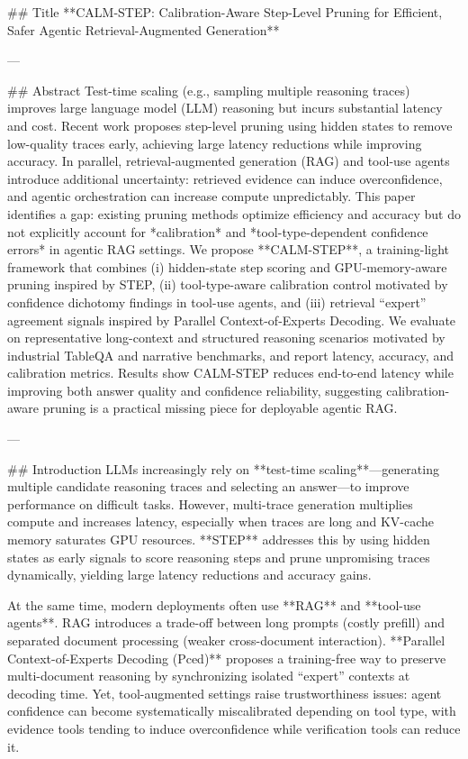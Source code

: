 ## Title  
**CALM-STEP: Calibration-Aware Step-Level Pruning for Efficient, Safer Agentic Retrieval-Augmented Generation**

---

## Abstract  
Test-time scaling (e.g., sampling multiple reasoning traces) improves large language model (LLM) reasoning but incurs substantial latency and cost. Recent work proposes step-level pruning using hidden states to remove low-quality traces early, achieving large latency reductions while improving accuracy. In parallel, retrieval-augmented generation (RAG) and tool-use agents introduce additional uncertainty: retrieved evidence can induce overconfidence, and agentic orchestration can increase compute unpredictably. This paper identifies a gap: existing pruning methods optimize efficiency and accuracy but do not explicitly account for *calibration* and *tool-type-dependent confidence errors* in agentic RAG settings. We propose **CALM-STEP**, a training-light framework that combines (i) hidden-state step scoring and GPU-memory-aware pruning inspired by STEP, (ii) tool-type-aware calibration control motivated by confidence dichotomy findings in tool-use agents, and (iii) retrieval “expert” agreement signals inspired by Parallel Context-of-Experts Decoding. We evaluate on representative long-context and structured reasoning scenarios motivated by industrial TableQA and narrative benchmarks, and report latency, accuracy, and calibration metrics. Results show CALM-STEP reduces end-to-end latency while improving both answer quality and confidence reliability, suggesting calibration-aware pruning is a practical missing piece for deployable agentic RAG.

---

## Introduction  
LLMs increasingly rely on **test-time scaling**—generating multiple candidate reasoning traces and selecting an answer—to improve performance on difficult tasks. However, multi-trace generation multiplies compute and increases latency, especially when traces are long and KV-cache memory saturates GPU resources. **STEP** addresses this by using hidden states as early signals to score reasoning steps and prune unpromising traces dynamically, yielding large latency reductions and accuracy gains.

At the same time, modern deployments often use **RAG** and **tool-use agents**. RAG introduces a trade-off between long prompts (costly prefill) and separated document processing (weaker cross-document interaction). **Parallel Context-of-Experts Decoding (Pced)** proposes a training-free way to preserve multi-document reasoning by synchronizing isolated “expert” contexts at decoding time. Yet, tool-augmented settings raise trustworthiness issues: agent confidence can become systematically miscalibrated depending on tool type, with evidence tools tending to induce overconfidence while verification tools can reduce it.

